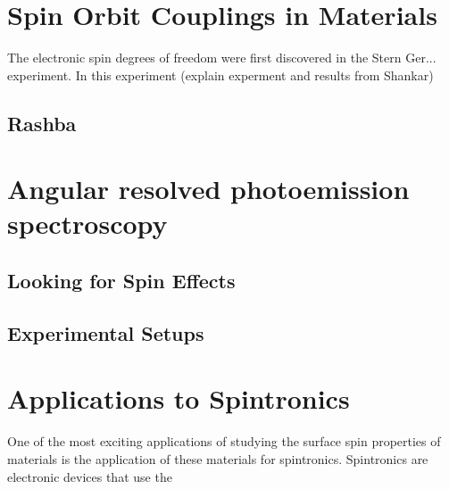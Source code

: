 \documentclass[12pt]{article}
\begin{document}
\section{Spin Orbit Couplings in Materials}
The electronic spin degrees of freedom were first discovered in the Stern Ger... experiment.
In this experiment (explain experment and results from Shankar)
\subsection{Rashba}
\section{Angular resolved photoemission spectroscopy}
\subsection{Looking for Spin Effects}
\subsection{Experimental Setups}
\section{Applications to Spintronics}
One of the most exciting applications of studying the surface spin properties of materials is the application of these materials for spintronics.
Spintronics are electronic devices that use the



\section{}



\end{document}
